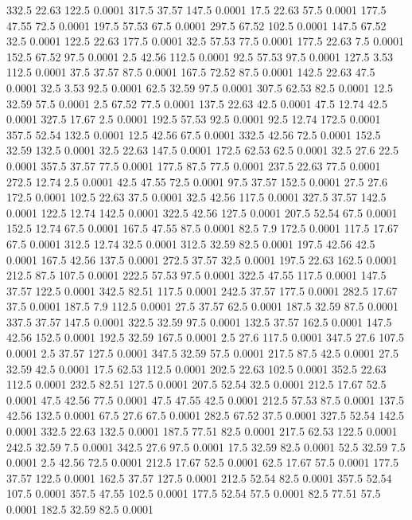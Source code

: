 332.5	22.63	122.5	0.0001
317.5	37.57	147.5	0.0001
17.5	22.63	57.5	0.0001
177.5	47.55	72.5	0.0001
197.5	57.53	67.5	0.0001
297.5	67.52	102.5	0.0001
147.5	67.52	32.5	0.0001
122.5	22.63	177.5	0.0001
32.5	57.53	77.5	0.0001
177.5	22.63	7.5	0.0001
152.5	67.52	97.5	0.0001
2.5	42.56	112.5	0.0001
92.5	57.53	97.5	0.0001
127.5	3.53	112.5	0.0001
37.5	37.57	87.5	0.0001
167.5	72.52	87.5	0.0001
142.5	22.63	47.5	0.0001
32.5	3.53	92.5	0.0001
62.5	32.59	97.5	0.0001
307.5	62.53	82.5	0.0001
12.5	32.59	57.5	0.0001
2.5	67.52	77.5	0.0001
137.5	22.63	42.5	0.0001
47.5	12.74	42.5	0.0001
327.5	17.67	2.5	0.0001
192.5	57.53	92.5	0.0001
92.5	12.74	172.5	0.0001
357.5	52.54	132.5	0.0001
12.5	42.56	67.5	0.0001
332.5	42.56	72.5	0.0001
152.5	32.59	132.5	0.0001
32.5	22.63	147.5	0.0001
172.5	62.53	62.5	0.0001
32.5	27.6	22.5	0.0001
357.5	37.57	77.5	0.0001
177.5	87.5	77.5	0.0001
237.5	22.63	77.5	0.0001
272.5	12.74	2.5	0.0001
42.5	47.55	72.5	0.0001
97.5	37.57	152.5	0.0001
27.5	27.6	172.5	0.0001
102.5	22.63	37.5	0.0001
32.5	42.56	117.5	0.0001
327.5	37.57	142.5	0.0001
122.5	12.74	142.5	0.0001
322.5	42.56	127.5	0.0001
207.5	52.54	67.5	0.0001
152.5	12.74	67.5	0.0001
167.5	47.55	87.5	0.0001
82.5	7.9	172.5	0.0001
117.5	17.67	67.5	0.0001
312.5	12.74	32.5	0.0001
312.5	32.59	82.5	0.0001
197.5	42.56	42.5	0.0001
167.5	42.56	137.5	0.0001
272.5	37.57	32.5	0.0001
197.5	22.63	162.5	0.0001
212.5	87.5	107.5	0.0001
222.5	57.53	97.5	0.0001
322.5	47.55	117.5	0.0001
147.5	37.57	122.5	0.0001
342.5	82.51	117.5	0.0001
242.5	37.57	177.5	0.0001
282.5	17.67	37.5	0.0001
187.5	7.9	112.5	0.0001
27.5	37.57	62.5	0.0001
187.5	32.59	87.5	0.0001
337.5	37.57	147.5	0.0001
322.5	32.59	97.5	0.0001
132.5	37.57	162.5	0.0001
147.5	42.56	152.5	0.0001
192.5	32.59	167.5	0.0001
2.5	27.6	117.5	0.0001
347.5	27.6	107.5	0.0001
2.5	37.57	127.5	0.0001
347.5	32.59	57.5	0.0001
217.5	87.5	42.5	0.0001
27.5	32.59	42.5	0.0001
17.5	62.53	112.5	0.0001
202.5	22.63	102.5	0.0001
352.5	22.63	112.5	0.0001
232.5	82.51	127.5	0.0001
207.5	52.54	32.5	0.0001
212.5	17.67	52.5	0.0001
47.5	42.56	77.5	0.0001
47.5	47.55	42.5	0.0001
212.5	57.53	87.5	0.0001
137.5	42.56	132.5	0.0001
67.5	27.6	67.5	0.0001
282.5	67.52	37.5	0.0001
327.5	52.54	142.5	0.0001
332.5	22.63	132.5	0.0001
187.5	77.51	82.5	0.0001
217.5	62.53	122.5	0.0001
242.5	32.59	7.5	0.0001
342.5	27.6	97.5	0.0001
17.5	32.59	82.5	0.0001
52.5	32.59	7.5	0.0001
2.5	42.56	72.5	0.0001
212.5	17.67	52.5	0.0001
62.5	17.67	57.5	0.0001
177.5	37.57	122.5	0.0001
162.5	37.57	127.5	0.0001
212.5	52.54	82.5	0.0001
357.5	52.54	107.5	0.0001
357.5	47.55	102.5	0.0001
177.5	52.54	57.5	0.0001
82.5	77.51	57.5	0.0001
182.5	32.59	82.5	0.0001
